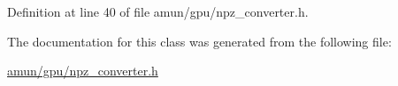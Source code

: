Definition at line 40 of file amun/gpu/npz\+\_\+converter.\+h.



The documentation for this class was generated from the following file\+:\begin{DoxyCompactItemize}
\item 
\hyperlink{amun_2gpu_2npz__converter_8h}{amun/gpu/npz\+\_\+converter.\+h}\end{DoxyCompactItemize}
